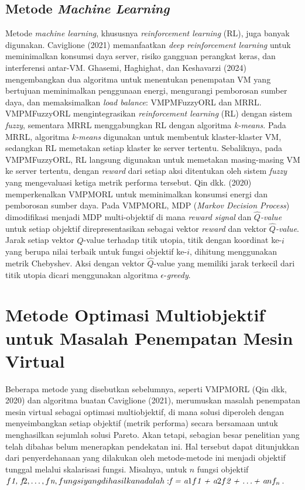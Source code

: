 \subsection{Metode \textit{Machine Learning}}
Metode \textit{machine learning}, khususnya \textit{reinforcement learning} (RL), juga banyak digunakan. Caviglione (2021) memanfaatkan \textit{deep reinforcement learning} untuk meminimalkan konsumsi daya server, risiko gangguan perangkat keras, dan interferensi antar-VM. Ghasemi, Haghighat, dan Keshavarzi (2024) mengembangkan dua algoritma untuk menentukan penempatan VM yang bertujuan meminimalkan penggunaan energi, mengurangi pemborosan sumber daya, dan memaksimalkan \textit{load balance}: VMPMFuzzyORL dan MRRL. VMPMFuzzyORL mengintegrasikan \textit{reinforcement learning} (RL) dengan sistem \textit{fuzzy}, sementara MRRL menggabungkan RL dengan algoritma \textit{k-means}. Pada MRRL, algoritma \textit{k-means} digunakan untuk membentuk klaster-klaster VM, sedangkan RL memetakan setiap klaster ke server tertentu. Sebaliknya, pada VMPMFuzzyORL, RL langsung digunakan untuk memetakan masing-masing VM ke server tertentu, dengan \textit{reward} dari setiap aksi ditentukan oleh sistem \textit{fuzzy} yang mengevaluasi ketiga metrik performa tersebut. Qin dkk. (2020) memperkenalkan VMPMORL untuk meminimalkan konsumsi energi dan pemborosan sumber daya. Pada VMPMORL, MDP (\textit{Markov Decision Process}) dimodifikasi menjadi MDP multi-objektif di mana \textit{reward signal} dan \textit{$\widehat{Q}$-value} untuk setiap objektif direpresentasikan sebagai vektor \textit{reward} dan vektor \textit{$\widehat{Q}$-value}. Jarak setiap vektor $\widehat{Q}$-value terhadap titik utopia, titik dengan koordinat ke-$i$ yang berupa nilai terbaik untuk fungsi objektif ke-$i$, dihitung menggunakan metrik Chebyshev. Aksi dengan vektor $\widehat{Q}$-value yang memiliki jarak terkecil dari titik utopia dicari menggunakan algoritma $\epsilon$-\textit{greedy}. 

\section{Metode Optimasi Multiobjektif untuk Masalah Penempatan Mesin Virtual}
Beberapa metode yang disebutkan sebelumnya, seperti VMPMORL (Qin dkk, 2020) dan algoritma buatan Caviglione (2021), merumuskan masalah penempatan mesin virtual sebagai optimasi multiobjektif, di mana solusi diperoleh dengan menyeimbangkan setiap objektif (metrik performa) secara bersamaan untuk menghasilkan sejumlah solusi Pareto. Akan tetapi, sebagian besar penelitian yang telah dibahas belum menerapkan pendekatan ini. Hal tersebut dapat ditunjukkan dari penyerdehanaan yang dilakukan oleh metode-metode ini menjadi objektif tunggal melalui skalarisasi fungsi. Misalnya, untuk $n$ fungsi objektif $f\textit{1, f}2, \dots, f\textit{n$, fungsi yang dihasilkan adalah: $f = a}1f\textit{1 + a}2f\textit{2 + \dots + a}nf_n$.

